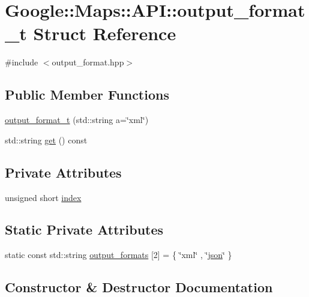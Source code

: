 \hypertarget{a00055}{}\section{Google\+:\+:Maps\+:\+:A\+PI\+:\+:output\+\_\+format\+\_\+t Struct Reference}
\label{a00055}


{\ttfamily \#include $<$output\+\_\+format.\+hpp$>$}

\subsection*{Public Member Functions}
\begin{DoxyCompactItemize}
\item 
\hyperlink{a00055_aee4b4f5757c465e4fdb7398a286daa57}{output\+\_\+format\+\_\+t} (std\+::string a=\char`\"{}xml\char`\"{})
\item 
std\+::string \hyperlink{a00055_a1cb355bdc5f1900bfd3ed472878eab4e}{get} () const
\end{DoxyCompactItemize}
\subsection*{Private Attributes}
\begin{DoxyCompactItemize}
\item 
unsigned short \hyperlink{a00055_a87d5d317a7e36a668ebb0316c794cb90}{index}
\end{DoxyCompactItemize}
\subsection*{Static Private Attributes}
\begin{DoxyCompactItemize}
\item 
static const std\+::string \hyperlink{a00055_a53d106f6d688b90fcf744fd3764a73ab}{output\+\_\+formats} \mbox{[}2\mbox{]} = \{ \char`\"{}xml\char`\"{} , \char`\"{}\hyperlink{a00011_ab701e3ac61a85b337ec5c1abaad6742d}{json}\char`\"{} \}
\end{DoxyCompactItemize}


\subsection{Constructor \& Destructor Documentation}
\mbox{\label{a00055_aee4b4f5757c465e4fdb7398a286daa57}} 
